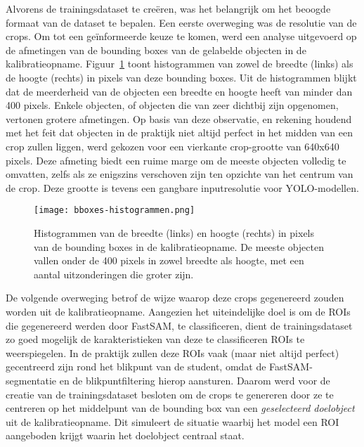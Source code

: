 Alvorens de trainingsdataset te creëren, was het belangrijk om het beoogde formaat van de dataset te bepalen.
Een eerste overweging was de resolutie van de crops. 
Om tot een geïnformeerde keuze te komen, werd een analyse uitgevoerd op de afmetingen van de bounding boxes 
van de gelabelde objecten in de kalibratieopname. 
Figuur~\ref{fig:size-histogram} toont histogrammen van zowel de breedte (links) als de hoogte (rechts) 
in pixels van deze bounding boxes. 
Uit de histogrammen blijkt dat de meerderheid van de objecten een breedte en hoogte heeft van minder dan 400 pixels. 
Enkele objecten, of objecten die van zeer dichtbij zijn opgenomen, vertonen grotere afmetingen. 
Op basis van deze observatie, en rekening houdend met het feit dat objecten in de praktijk 
niet altijd perfect in het midden van een crop zullen liggen, 
werd gekozen voor een vierkante crop-grootte van 640x640 pixels. 
Deze afmeting biedt een ruime marge om de meeste objecten volledig te omvatten, zelfs als ze enigszins 
verschoven zijn ten opzichte van het centrum van de crop. 
Deze grootte is tevens een gangbare inputresolutie voor YOLO-modellen.

\begin{figure}[H]
    \centering
    \texttt{[image: bboxes-histogrammen.png]}
    \caption[Histogrammen van de breedte en grootte in pixels van bounding boxes in de kalibratieopname]{
      \label{fig:size-histogram}
      Histogrammen van de breedte (links) en hoogte (rechts) in pixels van de bounding boxes in de kalibratieopname.
      De meeste objecten vallen onder de 400 pixels in zowel breedte als hoogte, met een aantal uitzonderingen die groter zijn.
    }
\end{figure}

De volgende overweging betrof de wijze waarop deze crops gegenereerd zouden worden uit de kalibratieopname. 
Aangezien het uiteindelijke doel is om de ROIs die gegenereerd werden door FastSAM, te classificeren, 
dient de trainingsdataset zo goed mogelijk de karakteristieken van deze te classificeren ROIs te weerspiegelen. 
In de praktijk zullen deze ROIs vaak (maar niet altijd perfect) gecentreerd zijn rond het blikpunt van de student, 
omdat de FastSAM-segmentatie en de blikpuntfiltering hierop aansturen. 
Daarom werd voor de creatie van de trainingsdataset besloten om de crops te genereren 
door ze te centreren op het middelpunt van de bounding box van een \textit{geselecteerd doelobject} uit de kalibratieopname. 
Dit simuleert de situatie waarbij het model een ROI aangeboden krijgt waarin het doelobject centraal staat.

